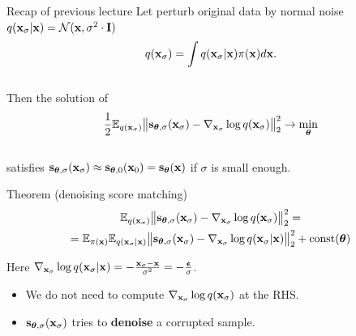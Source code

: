 

\begin{frame}
\titlepage
\end{frame}
\begin{frame}{Recap of previous lecture}
	Let perturb original data by normal noise $q(\mathbf{x}_{\sigma} | \mathbf{x}) = \mathcal{N}(\mathbf{x}, \sigma^2 \cdot \mathbf{I})$
	\vspace{-0.3cm}
	\[
	q(\mathbf{x}_{\sigma}) = \int q(\mathbf{x}_{\sigma} | \mathbf{x}) \pi(\mathbf{x}) d\mathbf{x}.
	\]
	\vspace{-0.6cm} \\
	Then the solution of 
	\vspace{-0.2cm}
	\[
	\frac{1}{2} \mathbb{E}_{q(\mathbf{x}_{\sigma})}\bigl\| \mathbf{s}_{\boldsymbol{\theta}, \sigma}(\mathbf{x}_{\sigma}) - \nabla_{\mathbf{x}_{\sigma}} \log q(\mathbf{x}_{\sigma}) \bigr\|^2_2 \rightarrow \min_{\boldsymbol{\theta}}
	\]
	\vspace{-0.5cm} \\
	satisfies $\mathbf{s}_{\boldsymbol{\theta}, \sigma}(\mathbf{x}_{\sigma}) \approx \mathbf{s}_{\boldsymbol{\theta}, 0}(\mathbf{x}_0) = \mathbf{s}_{\boldsymbol{\theta}}(\mathbf{x})$ if $\sigma$ is small enough.
	\begin{block}{Theorem (denoising score matching)}
		\vspace{-0.8cm}
		\begin{multline*}
			\mathbb{E}_{q(\mathbf{x}_{\sigma})}\bigl\| \mathbf{s}_{\boldsymbol{\theta}, \sigma}(\mathbf{x}_{\sigma}) - \nabla_{\mathbf{x}_{\sigma}} \log q(\mathbf{x}_{\sigma}) \bigr\|^2_2 = \\ = \mathbb{E}_{\pi(\mathbf{x})} \mathbb{E}_{q(\mathbf{x}_{\sigma} | \mathbf{x})}\bigl\| \mathbf{s}_{\boldsymbol{\theta}, \sigma}(\mathbf{x}_{\sigma}) - \nabla_{\mathbf{x}_{\sigma}} \log q(\mathbf{x}_{\sigma} | \mathbf{x}) \bigr\|^2_2 + \text{const}(\boldsymbol{\theta})
		\end{multline*}
		\vspace{-0.7cm}
	\end{block}
	Here $\nabla_{\mathbf{x}_{\sigma}} \log q(\mathbf{x}_{\sigma} | \mathbf{x}) = - \frac{\mathbf{x}_{\sigma} - \mathbf{x}}{\sigma^2} = - \frac{\boldsymbol{\epsilon}}{\sigma}$.
	\begin{itemize}
		\item We do not need to compute $\nabla_{\mathbf{x}_{\sigma}} \log q(\mathbf{x}_{\sigma})$ at the RHS.
		\item $\mathbf{s}_{\boldsymbol{\theta}, \sigma}(\mathbf{x}_{\sigma})$ tries to \textbf{denoise} a corrupted sample.
	\end{itemize}
\end{frame}
